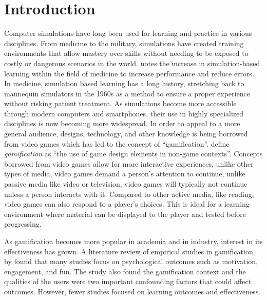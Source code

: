 \documentclass[letterpaper,man,natbib,floatsintext]{apa7}  %
\begin{document}
\section{Introduction}
Computer simulations have long been used for learning and practice in various disciplines. From medicine to the military, simulations have created training environments that allow mastery over skills without needing to be exposed 
to costly or dangerous scenarios in the world. \cite{lateef2010simulation} notes the increase in simulation-based learning within the field of medicine to increase performance and reduce errors. In medicine, simulation based learning has a long history, stretching back to mannequin simulators in the 1960s as a method to ensure a proper experience without risking patient treatment. As simulations become more accessible through modern computers and smartphones, their use
in highly specialized disciplines is now becoming more widespread. In order to appeal to a more general audience, 
designs, technology, and other knowledge is being borrowed from video games which has led to the concept of ``gamification''. \cite{deterding2011game} define {\it gamification} as ``the  use  of game  design  elements  in  non-game contexts''. Concepts borrowed from video games allow for more interactive experiences, unlike other types of media, video games demand 
a person's attention to continue, unlike passive media like video or television, video games will typically not continue unless a person interacts with it. Compared to other active media, like reading, video games can also respond to a player's choices. This is ideal for a learning environment where material can be displayed to the player and tested before progressing.

As gamification becomes more popular in academia and in industry, interest in its effectiveness has grown. A literature
review of empirical studies in gamification by \cite{hamari2014does} found that many studies focus on psychological outcomes such as motivation, engagement, and fun. The study also found the gamification context and the qualities of the users were two important confounding factors that could affect outcomes. However, fewer studies focused on learning outcomes and effectiveness.
\end{document}
